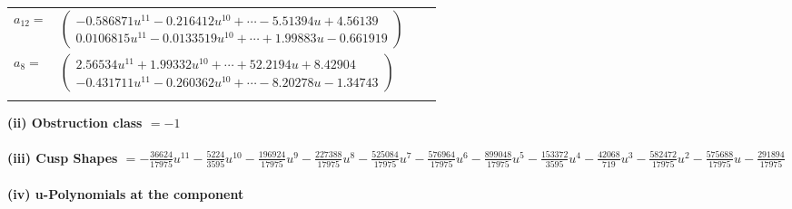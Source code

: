 \documentclass[1p]{elsarticle_modified}
\theoremstyle{definition}
\begin{document}
\begin{tabular}{m{7pt} m{180pt} m{7pt} m{180pt} }
\flushright $a_{12}=$&$\begin{pmatrix}-0.586871 u^{11}-0.216412 u^{10}+\cdots-5.51394 u+4.56139\\0.0106815 u^{11}-0.0133519 u^{10}+\cdots+1.99883 u-0.661919\end{pmatrix}$ \\
\flushright $a_{8}=$&$\begin{pmatrix}2.56534 u^{11}+1.99332 u^{10}+\cdots+52.2194 u+8.42904\\-0.431711 u^{11}-0.260362 u^{10}+\cdots-8.20278 u-1.34743\end{pmatrix}$\\&\end{tabular}
\flushleft \textbf{(ii) Obstruction class $= -1$}\\~\\
\flushleft \textbf{(iii) Cusp Shapes $= -\frac{36624}{17975} u^{11}-\frac{5224}{3595} u^{10}-\frac{196924}{17975} u^9-\frac{227388}{17975} u^8-\frac{525084}{17975} u^7-\frac{576964}{17975} u^6-\frac{899048}{17975} u^5-\frac{153372}{3595} u^4-\frac{42068}{719} u^3-\frac{582472}{17975} u^2-\frac{575688}{17975} u-\frac{291894}{17975}$}\\~\\
\newpage\renewcommand{\arraystretch}{1}
\flushleft \textbf{(iv) u-Polynomials at the component}\newline \\
\end{document}
